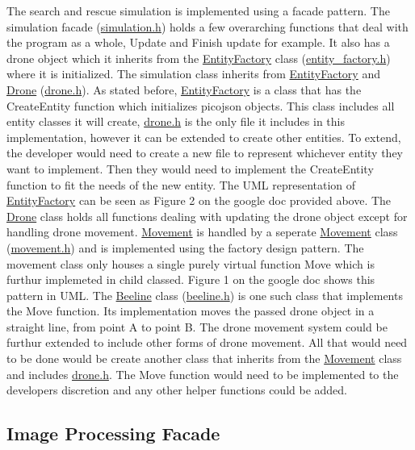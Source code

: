 The search and rescue simulation is implemented using a facade pattern. The simulation facade (\hyperlink{simulation_8h_source}{simulation.\+h}) holds a few overarching functions that deal with the program as a whole, Update and Finish update for example. It also has a drone object which it inherits from the \hyperlink{classEntityFactory}{Entity\+Factory} class (\hyperlink{entity__factory_8h_source}{entity\+\_\+factory.\+h}) where it is initialized. The simulation class inherits from \hyperlink{classEntityFactory}{Entity\+Factory} and \hyperlink{classDrone}{Drone} (\hyperlink{drone_8h_source}{drone.\+h}). As stated before, \hyperlink{classEntityFactory}{Entity\+Factory} is a class that has the Create\+Entity function which initializes picojson objects. This class includes all entity classes it will create, \hyperlink{drone_8h_source}{drone.\+h} is the only file it includes in this implementation, however it can be extended to create other entities. To extend, the developer would need to create a new file to represent whichever entity they want to implement. Then they would need to implement the Create\+Entity function to fit the needs of the new entity. The U\+ML representation of \hyperlink{classEntityFactory}{Entity\+Factory} can be seen as Figure 2 on the google doc provided above. The \hyperlink{classDrone}{Drone} class holds all functions dealing with updating the drone object except for handling drone movement. \hyperlink{classMovement}{Movement} is handled by a seperate \hyperlink{classMovement}{Movement} class (\hyperlink{movement_8h_source}{movement.\+h}) and is implemented using the factory design pattern. The movement class only houses a single purely virtual function Move which is furthur implemeted in child classed. Figure 1 on the google doc shows this pattern in U\+ML. The \hyperlink{classBeeline}{Beeline} class (\hyperlink{beeline_8h_source}{beeline.\+h}) is one such class that implements the Move function. It\textquotesingle{}s implementation moves the passed drone object in a straight line, from point A to point B. The drone movement system could be furthur extended to include other forms of drone movement. All that would need to be done would be create another class that inherits from the \hyperlink{classMovement}{Movement} class and includes \hyperlink{drone_8h_source}{drone.\+h}. The Move function would need to be implemented to the developers discretion and any other helper functions could be added.\hypertarget{index_image}{}\subsection{Image Processing Facade}\label{index_image}
